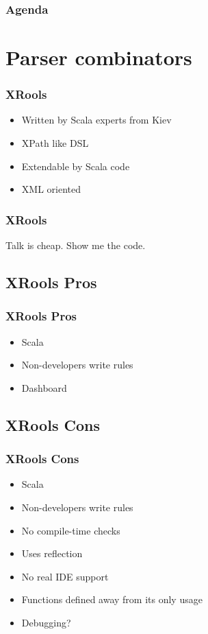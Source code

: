 \documentclass[14pt]{beamer}
\begin{document}
\frame%
{\frametitle{Agenda}
  \tableofcontents[1]
}

\section{Parser combinators}
\frame
{\frametitle{XRools}
\begin{itemize}
  \item Written by Scala experts from Kiev
  \item XPath like DSL
  \item Extendable by Scala code
  \item XML oriented
\end{itemize}
}

\frame
{\frametitle{XRools}
\begin{center}
  \large Talk is cheap. Show me the code.
\end{center}
}

\subsection{XRools Pros}
\frame
{\frametitle{XRools Pros}
\begin{itemize}
    \item<1-> Scala
    \item<2-> Non-developers write rules
    \item<3-> Dashboard 
\end{itemize}
}

\subsection{XRools Cons}
\frame
{\frametitle{XRools Cons}
\begin{itemize}
    \item<1-> Scala
    \item<2-> Non-developers write rules
    \item<3-> No compile-time checks
    \item<4-> Uses reflection
    \item<5-> No real IDE support
    \item<6-> Functions defined away from its only usage
    \item<7-> Debugging?
\end{itemize}
}
\end{document}
